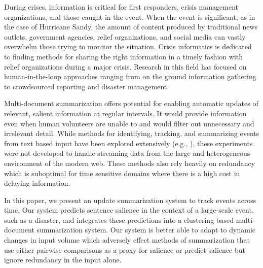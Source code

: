 \label{sec:introduction}
During crises, information is critical for first responders,
 crisis management organizations, and those caught in the event.  
When the event is significant, as in the case of Hurricane
Sandy, the amount of content produced by traditional news outlets,
government agencies, relief organizations, and social media can vastly
overwhelm those trying to monitor the situation. 
Crisis informatics\cite{?} is dedicated to finding methods for sharing the
right information in a timely fashion with relief organizations during a major crisis. 
Research in this field has focused on
human-in-the-loop approaches ranging from on the ground information gathering to
crowdsourced reporting and disaster management.

Multi-document summarization offers potential for enabling automatic updates of
relevant, salient information at regular intervals. It would provide
information even when human volunteers are unable to and would filter out
unnecessary and irrelevant detail. 
While methods for identifying,
tracking, and summarizing events from text based input have been explored
extensively
(e.g.,
\cite{allan1998topic,Filatova&Hatzivassiloglou.04a,Wang&al.11}), 
these experiments were not developed to handle streaming data from the large
and heterogeneous environment of the modern web. 
These methods also rely heavily on redundancy which is suboptimal for time
sensitive domains where there is a high cost in delaying information.
 








In this paper, we present an update summarization system to track events
across time. Our system predicts sentence salience in the context of a
large-scale event, such as a disaster, and integrates these predictions into
a clustering based multi-document summarization system. 
Our system is better able to adapt to
dynamic changes in input volume which adversely 
effect methods of summarization that use either pairwise
comparisons as a proxy for salience or predict salience but
ignore redundancy in the input alone.

